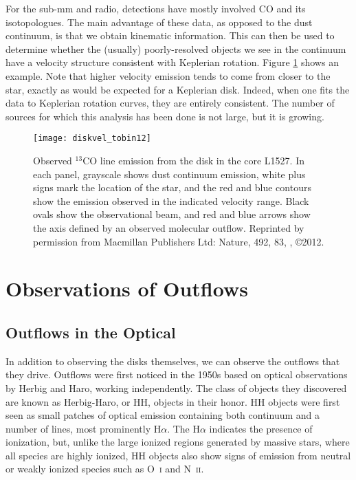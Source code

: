 For the sub-mm and radio, detections have mostly involved CO and its isotopologues. The main advantage of these data, as opposed to the dust continuum, is that we obtain kinematic information. This can then be used to determine whether the (usually) poorly-resolved objects we see in the continuum have a velocity structure consistent with Keplerian rotation.  Figure \ref{fig:diskvel_tobin12} shows an example. Note that higher velocity emission tends to come from closer to the star, exactly as would be expected for a Keplerian disk. Indeed, when one fits the data to Keplerian rotation curves, they are entirely consistent. The number of sources for which this analysis has been done is not large, but it is growing.

\begin{figure}
\texttt{[image: diskvel\_tobin12]}
\caption[$^{13}$CO channel maps of the disk in L1527]{
\label{fig:diskvel_tobin12}
Observed $^{13}$CO line emission from the disk in the core L1527. In each panel, grayscale shows dust continuum emission, white plus signs mark the location of the star, and the red and blue contours show the emission observed in the indicated velocity range. Black ovals show the observational beam, and red and blue arrows show the axis defined by an observed molecular outflow. Reprinted by permission from Macmillan Publishers Ltd: Nature, 492, 83, \citeauthor{tobin12a}, \copyright 2012.
}
\end{figure}



\section{Observations of Outflows}

\subsection{Outflows in the Optical}

In addition to observing the disks themselves, we can observe the outflows that they drive. Outflows were first noticed in the 1950s based on optical observations by Herbig and Haro, working independently. The class of objects they discovered are known as Herbig-Haro, or HH, objects in their honor. HH objects were first seen as small patches of optical emission containing both continuum and a number of lines, most prominently H$\alpha$. The H$\alpha$ indicates the presence of ionization, but, unlike the large ionized regions generated by massive stars, where all species are highly ionized, HH objects also show signs of emission from neutral or weakly ionized species such as O~\textsc{i} and N~\textsc{ii}.

